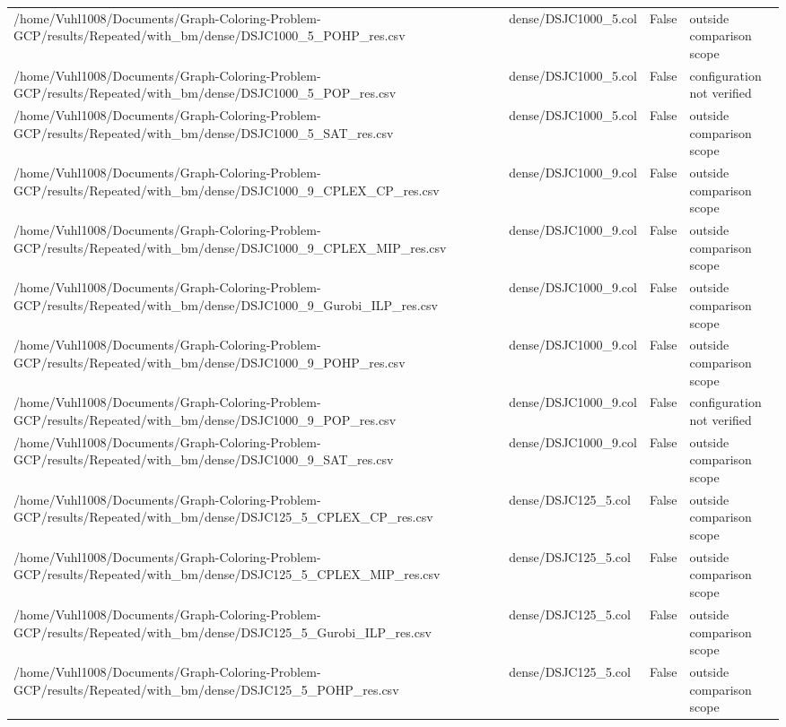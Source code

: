 \begin{table}[htbp]
\begin{tabular}{llll}
/home/Vuhl1008/Documents/Graph-Coloring-Problem-GCP/results/Repeated/with\_bm/dense/DSJC1000\_5\_POHP\_res.csv & dense/DSJC1000\_5.col & False & outside comparison scope \\
/home/Vuhl1008/Documents/Graph-Coloring-Problem-GCP/results/Repeated/with\_bm/dense/DSJC1000\_5\_POP\_res.csv & dense/DSJC1000\_5.col & False & configuration not verified \\
/home/Vuhl1008/Documents/Graph-Coloring-Problem-GCP/results/Repeated/with\_bm/dense/DSJC1000\_5\_SAT\_res.csv & dense/DSJC1000\_5.col & False & outside comparison scope \\
/home/Vuhl1008/Documents/Graph-Coloring-Problem-GCP/results/Repeated/with\_bm/dense/DSJC1000\_9\_CPLEX\_CP\_res.csv & dense/DSJC1000\_9.col & False & outside comparison scope \\
/home/Vuhl1008/Documents/Graph-Coloring-Problem-GCP/results/Repeated/with\_bm/dense/DSJC1000\_9\_CPLEX\_MIP\_res.csv & dense/DSJC1000\_9.col & False & outside comparison scope \\
/home/Vuhl1008/Documents/Graph-Coloring-Problem-GCP/results/Repeated/with\_bm/dense/DSJC1000\_9\_Gurobi\_ILP\_res.csv & dense/DSJC1000\_9.col & False & outside comparison scope \\
/home/Vuhl1008/Documents/Graph-Coloring-Problem-GCP/results/Repeated/with\_bm/dense/DSJC1000\_9\_POHP\_res.csv & dense/DSJC1000\_9.col & False & outside comparison scope \\
/home/Vuhl1008/Documents/Graph-Coloring-Problem-GCP/results/Repeated/with\_bm/dense/DSJC1000\_9\_POP\_res.csv & dense/DSJC1000\_9.col & False & configuration not verified \\
/home/Vuhl1008/Documents/Graph-Coloring-Problem-GCP/results/Repeated/with\_bm/dense/DSJC1000\_9\_SAT\_res.csv & dense/DSJC1000\_9.col & False & outside comparison scope \\
/home/Vuhl1008/Documents/Graph-Coloring-Problem-GCP/results/Repeated/with\_bm/dense/DSJC125\_5\_CPLEX\_CP\_res.csv & dense/DSJC125\_5.col & False & outside comparison scope \\
/home/Vuhl1008/Documents/Graph-Coloring-Problem-GCP/results/Repeated/with\_bm/dense/DSJC125\_5\_CPLEX\_MIP\_res.csv & dense/DSJC125\_5.col & False & outside comparison scope \\
/home/Vuhl1008/Documents/Graph-Coloring-Problem-GCP/results/Repeated/with\_bm/dense/DSJC125\_5\_Gurobi\_ILP\_res.csv & dense/DSJC125\_5.col & False & outside comparison scope \\
/home/Vuhl1008/Documents/Graph-Coloring-Problem-GCP/results/Repeated/with\_bm/dense/DSJC125\_5\_POHP\_res.csv & dense/DSJC125\_5.col & False & outside comparison scope \\

\end{tabular}
\end{table}
